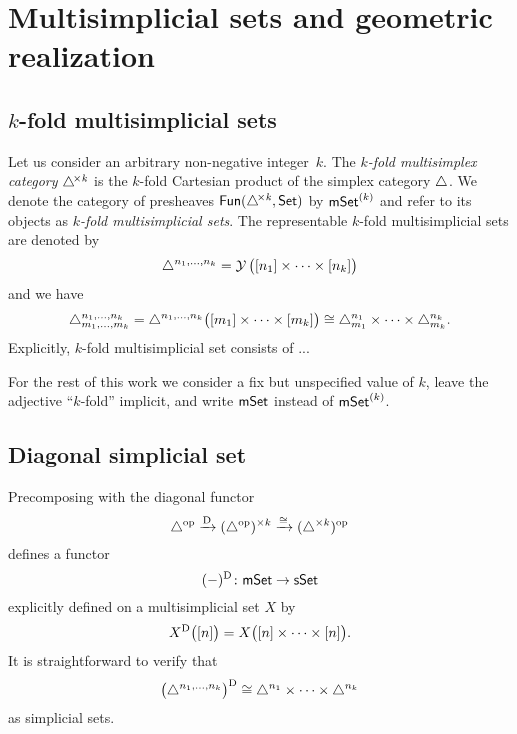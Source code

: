 
\section{Multisimplicial sets and geometric realization}

\subsection{$k$-fold multisimplicial sets}

Let us consider an arbitrary non-negative integer~$k$.
The \textit{$k$-fold multisimplex category} $\triangle^{\!\times\mathit{k}}$ is the $k$-fold Cartesian product of the simplex category $\triangle$.
We denote the category of presheaves $\mathsf{Fun}(\triangle^{\!\times\mathit{k}}, \mathsf{Set})$ by $\mathsf{mSet}^{(k)}$ and refer to its objects as \textit{$k$-fold multisimplicial sets}.
The representable $k$-fold multisimplicial sets are denoted by
\[
\triangle^{n_1, \dots, n_k} = \operatorname{\mathcal{Y}} \big( [n_1] \times \cdots \times [n_k] \big)
\]
and we have
\[
\triangle^{n_1, \dots, n_k}_{m_1, \dots, m_k} =
\triangle^{n_1, \dots, n_k} \big( [m_1] \times \cdots \times [m_k] \big) \cong
\triangle^{n_1}_{m_1} \times \dots \times \triangle^{n_k}_{m_k}.
\]
Explicitly, $k$-fold multisimplicial set consists of ...


\begin{convention}
	For the rest of this work we consider a fix but unspecified value of $k$, leave the adjective ``$k$-fold'' implicit, and write $\mathsf{mSet}$ instead of $\mathsf{mSet}^{(k)}$.
\end{convention}


\subsection{Diagonal simplicial set} \label{ss:diagonal simplicial set}

Precomposing with the diagonal functor
\[
\triangle^{\mathrm{op}} \xrightarrow{\mathrm{D}}
(\triangle^{\mathrm{op}})^{\times k} \xrightarrow{\cong}
(\triangle^{\times k})^{\mathrm{op}}
\]
defines a functor
\[
(-)^{\mathrm{D}} \colon \mathsf{mSet} \to \mathsf{sSet}
\]
explicitly defined on a multisimplicial set $X$ by
\[
X^{\mathrm{D}} \big( [n] \big) = X \big( [n] \times \dots \times [n] \big).
\]
It is straightforward to verify that
\[
\big( \triangle^{n_1, \dots, n_k} \big)^{\mathrm{D}} \cong
\triangle^{n_1} \times \dots \times \triangle^{n_k}
\]
as simplicial sets.

